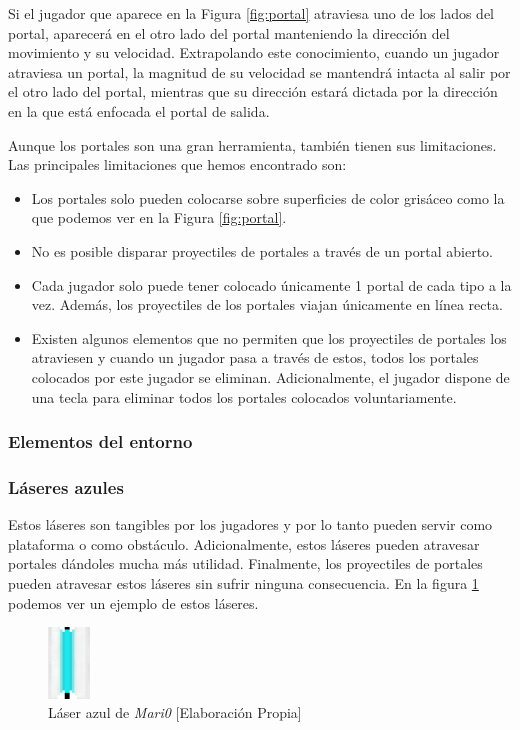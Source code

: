 Si el jugador que aparece en la Figura \ref{fig:portal} atraviesa uno de los lados del portal, aparecerá en el otro lado del portal manteniendo la dirección del movimiento y su velocidad. Extrapolando este conocimiento, cuando un jugador atraviesa un portal, la magnitud de su velocidad se mantendrá intacta al salir por el otro lado del portal, mientras que su dirección estará dictada por la dirección en la que está enfocada el portal de salida.

Aunque los portales son una gran herramienta, también tienen sus limitaciones. Las principales limitaciones que hemos encontrado son:

\begin{itemize}
    \item Los portales solo pueden colocarse sobre superficies de color grisáceo como la que podemos ver en la Figura \ref{fig:portal}.
    \item No es posible disparar proyectiles de portales a través de un portal abierto.
    \item Cada jugador solo puede tener colocado únicamente 1 portal de cada tipo a la vez. Además, los proyectiles de los portales viajan únicamente en línea recta.
    \item Existen algunos elementos que no permiten que los proyectiles de portales los atraviesen y cuando un jugador pasa a través de estos, todos los portales colocados por este jugador se eliminan. Adicionalmente, el jugador dispone de una tecla para eliminar todos los portales colocados voluntariamente.
\end{itemize}


\subsubsection{Elementos del entorno}

\subsubsection*{Láseres azules}

Estos láseres son tangibles por los jugadores y por lo tanto pueden servir como plataforma o como obstáculo. Adicionalmente, estos láseres pueden atravesar portales dándoles mucha más utilidad. Finalmente, los proyectiles de portales pueden atravesar estos láseres sin sufrir ninguna consecuencia. En la figura \ref {fig:laser-azul} podemos ver un ejemplo de estos láseres.
\begin{figure}[h]
    \centering
    \includegraphics[width=0.1\textwidth]{img/laser-azul.png}
    \caption{Láser azul de \textit{Mari0} [Elaboración Propia]}
    \label{fig:laser-azul}
\end{figure}

